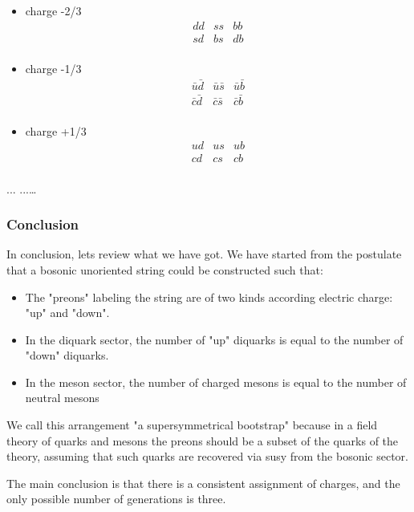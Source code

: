 \documentclass[a4paper]{article}
\begin{document}
\begin{itemize}
\begin{itemize}
\item charge -2/3
$$\begin{array}{ccc} 
                 d d &  s s &  b b \\ 
                 s d &  b s &  d b \\
                \end{array}$$
\item charge -1/3
$$\begin{array}{ccc} 
                 \bar u \bar d & \bar u\bar s & \bar u \bar b \\ 
                 \bar c \bar d & \bar c\bar s & \bar c \bar b \\
                \end{array}$$
                \item charge +1/3
$$\begin{array}{ccc} 
                  u  d & u s & u b \\ 
                  c  d & c s & c b \\
                \end{array}$$
\end {itemize}
\end{itemize}

 
... ...\dots{}

\subsubsection*{Conclusion}


In conclusion, lets review what we have got. We have started from the
postulate that a bosonic unoriented string could be constructed such that:

\begin{itemize}
\item The "preons" labeling the string are of two kinds according electric
charge: "up" and "down".
\item In the diquark sector, the number of "up" diquarks is equal to the number
of "down" diquarks.
\item In the meson sector, the number of charged mesons is equal to the number
of neutral mesons
\end{itemize}
 
We call this arrangement "a supersymmetrical bootstrap" because
in a field theory of quarks and mesons 
the preons should be a subset of the quarks of the theory,
assuming that such quarks are recovered via susy from the bosonic
sector. 

The main conclusion is that there is a consistent assignment of charges,
and the only possible number of generations is three.
\end{document}
